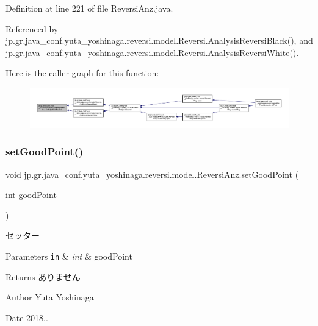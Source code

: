 Definition at line 221 of file Reversi\+Anz.\+java.



Referenced by jp.\+gr.\+java\+\_\+conf.\+yuta\+\_\+yoshinaga.\+reversi.\+model.\+Reversi.\+Analysis\+Reversi\+Black(), and jp.\+gr.\+java\+\_\+conf.\+yuta\+\_\+yoshinaga.\+reversi.\+model.\+Reversi.\+Analysis\+Reversi\+White().

Here is the caller graph for this function\+:
\nopagebreak
\begin{figure}[H]
\begin{center}
\leavevmode
\includegraphics[width=350pt]{classjp_1_1gr_1_1java__conf_1_1yuta__yoshinaga_1_1reversi_1_1model_1_1_reversi_anz_ae08ab4f24718ec5f1f84bd0f26da41fd_icgraph}
\end{center}
\end{figure}
\mbox{\label{classjp_1_1gr_1_1java__conf_1_1yuta__yoshinaga_1_1reversi_1_1model_1_1_reversi_anz_a50331f4e92029a1cf2ac365eb53f8449}} 
\subsubsection{\texorpdfstring{set\+Good\+Point()}{setGoodPoint()}}
{\footnotesize\ttfamily void jp.\+gr.\+java\+\_\+conf.\+yuta\+\_\+yoshinaga.\+reversi.\+model.\+Reversi\+Anz.\+set\+Good\+Point (\begin{DoxyParamCaption}\item[{int}]{good\+Point }\end{DoxyParamCaption})}



セッター 


\begin{DoxyParams}[1]{Parameters}
\mbox{\tt in}  & {\em int} & good\+Point \\
\hline
\end{DoxyParams}
\begin{DoxyReturn}{Returns}
ありません 
\end{DoxyReturn}
\begin{DoxyAuthor}{Author}
Yuta Yoshinaga 
\end{DoxyAuthor}
\begin{DoxyDate}{Date}
2018.. 
\end{DoxyDate}



